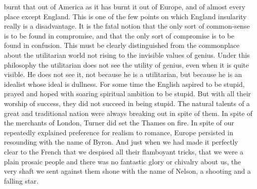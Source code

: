 \documentclass{book}
\begin{document}
burnt that out of America as it has burnt it out of Europe, and of almost every place except England. This is one of the few points on which England insularity really is a disadvantage. It is the fatal notion that the only sort of common-sense is to be found in compromise, and that the only sort of compromise is to be found in confusion. This must be clearly distinguished from the commonplace about the utilitarian world not rising to the invisible values of genius. Under this philosophy the utilitarian does not see the utility of genius, even when it is quite visible. He does not see it, not because he is a utilitarian, but because he is an idealist whose ideal is dullness. For some time the English aspired to be stupid, prayed and hoped with soaring spiritual ambition to be stupid. But with all their worship of success, they did not succeed in being stupid. The natural talents of a great and traditional nation were always breaking out in spite of them. In spite of the merchants of London, Turner did set the Thames on fire. In spite of our repeatedly explained preference for realism to romance, Europe persisted in resounding with the name of Byron. And just when we had made it perfectly clear to the French that we despised all their flamboyant tricks, that we were a plain prosaic people and there was no fantastic glory or chivalry about us, the very shaft we sent against them shone with the name of Nelson, a shooting and a falling star.
\end{document}
